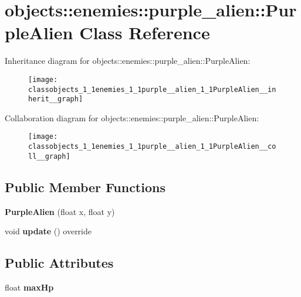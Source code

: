 \hypertarget{classobjects_1_1enemies_1_1purple__alien_1_1PurpleAlien}{}\section{objects\+:\+:enemies\+:\+:purple\+\_\+alien\+:\+:Purple\+Alien Class Reference}
\label{classobjects_1_1enemies_1_1purple__alien_1_1PurpleAlien}


Inheritance diagram for objects\+:\+:enemies\+:\+:purple\+\_\+alien\+:\+:Purple\+Alien\+:\nopagebreak
\begin{figure}[H]
\begin{center}
\leavevmode
\texttt{[image: classobjects\_1\_1enemies\_1\_1purple\_\_alien\_1\_1PurpleAlien\_\_inherit\_\_graph]}
\end{center}
\end{figure}


Collaboration diagram for objects\+:\+:enemies\+:\+:purple\+\_\+alien\+:\+:Purple\+Alien\+:\nopagebreak
\begin{figure}[H]
\begin{center}
\leavevmode
\texttt{[image: classobjects\_1\_1enemies\_1\_1purple\_\_alien\_1\_1PurpleAlien\_\_coll\_\_graph]}
\end{center}
\end{figure}
\subsection*{Public Member Functions}
\begin{DoxyCompactItemize}
\item 
\mbox{\label{classobjects_1_1enemies_1_1purple__alien_1_1PurpleAlien_a19496a9f49da18c9c260f98194e695e6}}
{\bfseries Purple\+Alien} (float x, float y)
\item 
\mbox{\label{classobjects_1_1enemies_1_1purple__alien_1_1PurpleAlien_a2e9d3a7d34dc72d7541ccb572b6d5a11}}
void {\bfseries update} () override
\end{DoxyCompactItemize}
\subsection*{Public Attributes}
\begin{DoxyCompactItemize}
\item 
\mbox{\label{classobjects_1_1enemies_1_1purple__alien_1_1PurpleAlien_aacaf3e961373d9ef3a0d05758a811860}}
float {\bfseries max\+Hp}
\end{DoxyCompactItemize}
